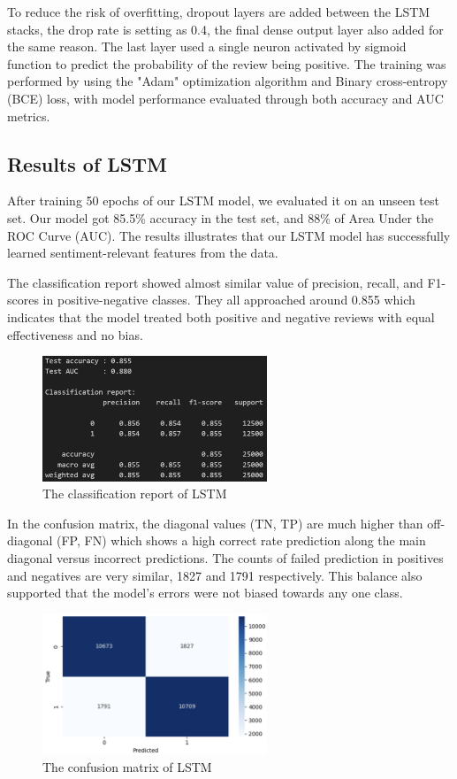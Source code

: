 To reduce the risk of overfitting, dropout layers are added between the LSTM stacks, the drop rate is setting as 0.4, the final dense output layer also added for the same reason. The last layer used a single neuron activated by sigmoid function to predict the probability of the review being positive. The training was performed by using the "Adam" optimization algorithm and Binary cross-entropy (BCE) loss, with model performance evaluated through both accuracy and AUC metrics.

\subsection{Results of LSTM}
After training 50 epochs of our LSTM model, we evaluated it on an unseen test set. Our model got 85.5\% accuracy in the test set, and 88\% of Area Under the ROC Curve (AUC). The results illustrates that our LSTM model has successfully learned sentiment-relevant features from the data.

The classification report showed almost similar value of precision, recall, and F1-scores in positive-negative classes. They all approached around 0.855 which indicates that the model treated both positive and negative reviews with equal effectiveness and no bias.

\begin{figure}[ht]
    \centering
    \includegraphics[width=0.6\textwidth]{pics/lstm_report.png}
    \caption{The classification report of LSTM}
\end{figure}

In the confusion matrix, the diagonal values (TN, TP) are much higher than off-diagonal (FP, FN) which shows a high correct rate prediction along the main diagonal versus incorrect predictions. The counts of failed prediction in positives and negatives are very similar, 1827 and 1791 respectively. This balance also supported that the model's errors were not biased towards any one class.

\begin{figure}[ht]
    \centering
    \includegraphics[width=0.6\textwidth]{pics/lstm_metrix.png}
    \caption{The confusion matrix of LSTM}
\end{figure}

